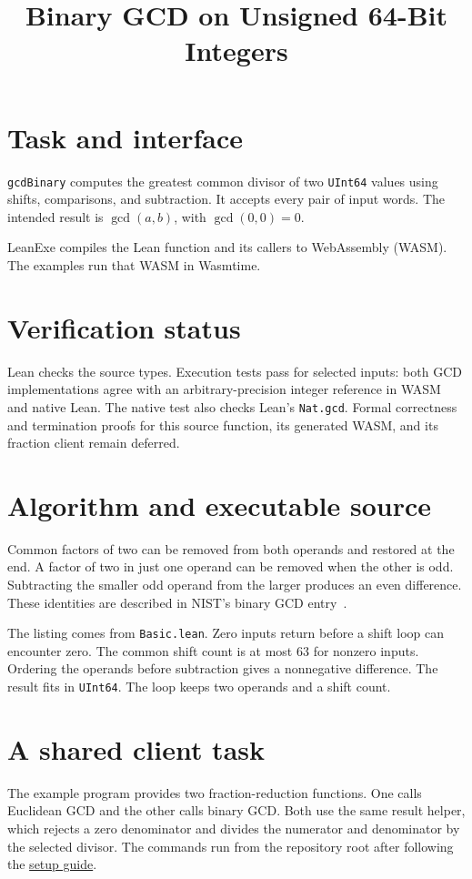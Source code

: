 
\title{Binary GCD on Unsigned 64-Bit Integers}

\maketitle

\section{Task and interface}
\texttt{gcdBinary} computes the greatest common divisor of two \texttt{UInt64}
values using shifts, comparisons, and subtraction.  It accepts every pair of
input words.  The intended result is $\gcd(a,b)$, with $\gcd(0,0)=0$.

LeanExe compiles the Lean function and its callers to WebAssembly (WASM).
The examples run that WASM in Wasmtime.

\section{Verification status}
Lean checks the source types.  Execution tests pass for selected inputs:
both GCD implementations agree with an arbitrary-precision integer reference
in WASM and native Lean.  The native test also checks Lean's \texttt{Nat.gcd}.
Formal correctness and termination proofs for this source function,
its generated WASM, and its fraction client remain deferred.

\section{Algorithm and executable source}
Common factors of two can be removed from both operands and restored at the
end.  A factor of two in just one operand can be removed when the other is odd.
Subtracting the smaller odd operand from the larger produces an even difference.
These identities are described in NIST's binary GCD entry~\cite{binary}.



The listing comes from \texttt{Basic.lean}.  Zero inputs return before a shift
loop can encounter zero.  The common shift count is at most 63 for nonzero
inputs.  Ordering the operands before subtraction gives a nonnegative
difference.  The result fits in \texttt{UInt64}.  The loop keeps two operands
and a shift count.

\section{A shared client task}
The example program provides two fraction-reduction functions.  One calls
Euclidean GCD and the other calls binary GCD.  Both use the same result helper,
which rejects a zero denominator and divides the numerator and denominator
by the selected divisor.  The commands run from the repository root after
following the
\href{https://github.com/jsmorph/leanexe/blob/lib1/DEVELOPING.md}{setup guide}.

